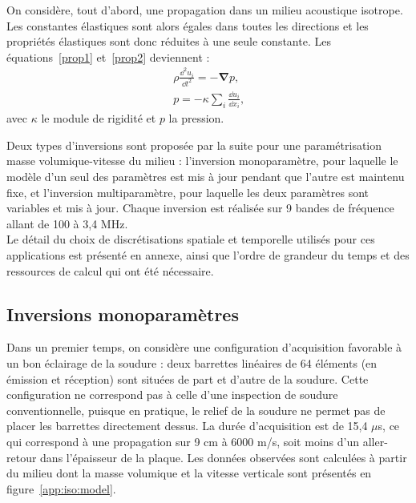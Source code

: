On considère, tout d'abord, une propagation dans un milieu acoustique isotrope. Les constantes élastiques sont alors égales dans toutes les directions et les propriétés élastiques sont donc réduites à une seule constante. Les équations~\ref{prop1} et~\ref{prop2} deviennent : 
\begin{eqnarray}
	\rho \frac{\dd^2 u_{i}}{\dd t^2} = -\bm{\nabla} p \text{,}\\
	p=-\kappa \displaystyle\sum_{i} \frac{\dd u_{i}}{\dd x_{i}}\text{,}
\end{eqnarray}
avec $\kappa$ le module de rigidité et $p$ la pression.

Deux types d'inversions sont proposée par la suite pour une paramétrisation masse volumique-vitesse du milieu : l'inversion monoparamètre, pour laquelle le modèle d'un seul des paramètres est mis à jour pendant que l'autre est maintenu fixe, et l'inversion multiparamètre, pour laquelle les deux paramètres sont variables et mis à jour. Chaque inversion est réalisée sur 9 bandes de fréquence allant de 100 à 3,4 MHz.\\

Le détail du choix de discrétisations spatiale et temporelle utilisés pour ces applications est présenté en annexe, ainsi que l'ordre de grandeur du temps et des ressources de calcul qui ont été nécessaire.


\subsection{Inversions monoparamètres}

 Dans un premier temps, on considère une configuration d'acquisition favorable à un bon éclairage de la soudure : deux barrettes linéaires de 64 éléments (en émission et réception) sont situées de part et d'autre de la soudure. Cette configuration ne correspond pas à celle d'une inspection de soudure conventionnelle, puisque en pratique, le relief de la soudure ne permet pas de placer les barrettes directement dessus. La durée d'acquisition est de 15,4 $\mu$s, ce qui correspond à une propagation sur 9 cm à 6000 m/s, soit moins d'un aller-retour dans l'épaisseur de la plaque. Les données observées sont calculées à partir du milieu dont la masse volumique et  la vitesse verticale sont présentés en figure~\ref{app:iso:model}.\\


